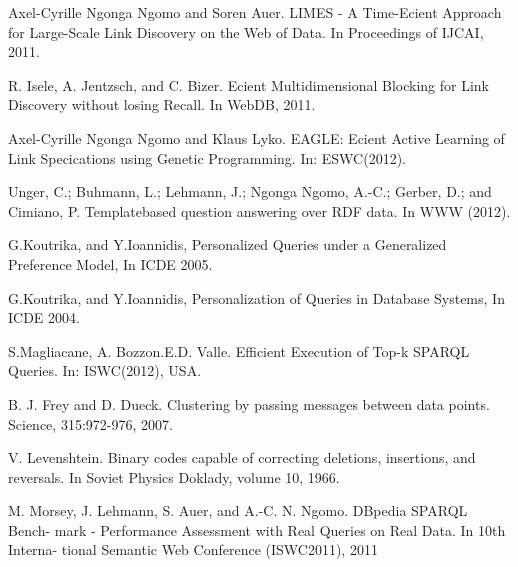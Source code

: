 \documentclass{sig-alternate}  %
\begin{document}
\begin{thebibliography}{10}
Axel-Cyrille Ngonga Ngomo and Soren Auer. LIMES -
A Time-Ecient Approach for Large-Scale Link Discovery on the Web of
Data. In Proceedings of IJCAI, 2011.

 R. Isele, A. Jentzsch, and C. Bizer. Ecient Multidimensional
Blocking for Link Discovery without losing Recall. In WebDB, 2011.

Axel-Cyrille Ngonga Ngomo and Klaus Lyko. EAGLE:
Ecient Active Learning of Link Specications using Genetic Programming.
In: ESWC(2012).

Unger, C.; Buhmann, L.; Lehmann, J.; Ngonga Ngomo,
A.-C.; Gerber, D.; and Cimiano, P. Templatebased question answering
over RDF data. In WWW (2012).

G.Koutrika, and Y.Ioannidis, Personalized Queries
under a Generalized Preference Model, In ICDE 2005.

G.Koutrika, and Y.Ioannidis, Personalization of Queries
in Database Systems, In ICDE 2004.

S.Magliacane, A. Bozzon.E.D. Valle. Efficient Execution
of Top-k SPARQL Queries. In: ISWC(2012), USA. 

B. J. Frey and D. Dueck. Clustering by passing messages
between data points. Science, 315:972-976, 2007.

\bibitem{key-37}{]} V. Levenshtein. Binary codes capable of correcting
deletions, insertions, and reversals. In Soviet Physics Doklady, volume
10, 1966.

M. Morsey, J. Lehmann, S. Auer, and A.-C. N. Ngomo.
DBpedia SPARQL Bench- mark - Performance Assessment with Real Queries
on Real Data. In 10th Interna- tional Semantic Web Conference (ISWC2011),
2011\end{thebibliography}
\end{document}
